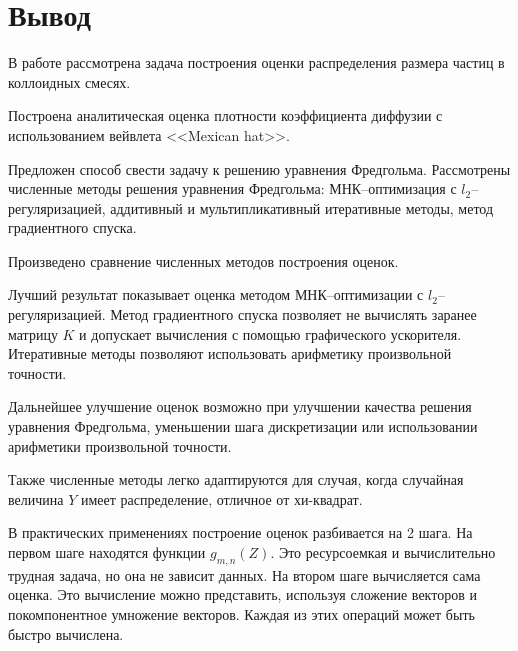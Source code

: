 \documentclass[../paper.tex]{subfiles}
\begin{document}
\section{Вывод}
В работе рассмотрена задача построения оценки распределения размера частиц в коллоидных смесях.

Построена аналитическая оценка плотности коэффициента диффузии с использованием вейвлета <<Mexican hat>>.

Предложен способ свести задачу к решению уравнения Фредгольма.
Рассмотрены численные методы решения уравнения Фредгольма: МНК--оптимизация с $l_2$--регуляризацией,
аддитивный и мультипликативный итеративные методы, метод градиентного спуска.

Произведено сравнение численных методов построения оценок.

Лучший результат показывает оценка методом МНК--оптимизации с $l_2$--регуляризацией.
Метод градиентного спуска позволяет не вычислять заранее матрицу $K$ и допускает вычисления с помощью графического ускорителя.
Итеративные методы позволяют использовать арифметику произвольной точности.

Дальнейшее улучшение оценок возможно при улучшении качества решения уравнения Фредгольма, уменьшении шага дискретизации или
использовании арифметики произвольной точности.

Также численные методы легко адаптируются для случая, когда случайная величина $Y$ имеет распределение, отличное от хи-квадрат.

В практических применениях построение оценок разбивается на 2 шага. На первом шаге находятся функции $g_{m,n}(Z)$. Это ресурсоемкая и вычислительно трудная задача,
но она не зависит данных. На втором шаге вычисляется сама оценка. Это вычисление можно представить, используя сложение векторов и покомпонентное умножение векторов.
Каждая из этих операций может быть быстро вычислена.
\end{document}
